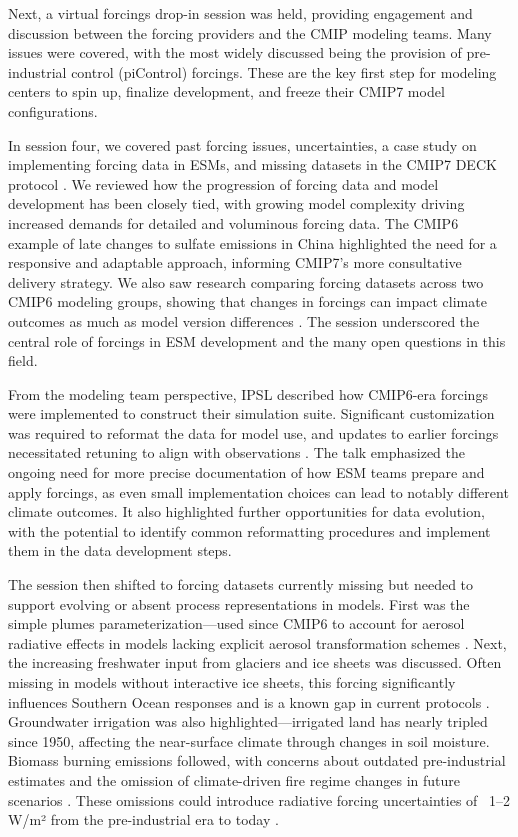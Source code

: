 \documentclass{ametsocV6.1}
\begin{document}
Next, a virtual forcings drop-in session was held, providing engagement and discussion between the forcing providers and the CMIP modeling teams. Many issues were covered, with the most widely discussed being the provision of pre-industrial control (piControl) forcings. These are the key first step for modeling centers to spin up, finalize development, and freeze their CMIP7 model configurations.

In session four, we covered past forcing issues, uncertainties, a case study on implementing forcing data in ESMs, and missing datasets in the CMIP7 DECK protocol \citep{dunne_evolving_2024}. We reviewed how the progression of forcing data and model development has been closely tied, with growing model complexity driving increased demands for detailed and voluminous forcing data. The CMIP6 example of late changes to sulfate emissions in China highlighted the need for a responsive and adaptable approach, informing CMIP7’s more consultative delivery strategy. We also saw research comparing forcing datasets across two CMIP6 modeling groups, showing that changes in forcings can impact climate outcomes as much as model version differences \citep{fyfe_significant_2021,holland_new_2024}. The session underscored the central role of forcings in ESM development and the many open questions in this field.

From the modeling team perspective, IPSL described how CMIP6-era forcings were implemented to construct their simulation suite. Significant customization was required to reformat the data for model use, and updates to earlier forcings necessitated retuning to align with observations \citep{lurton_implementation_2020}. The talk emphasized the ongoing need for more precise documentation of how ESM teams prepare and apply forcings, as even small implementation choices can lead to notably different climate outcomes. It also highlighted further opportunities for data evolution, with the potential to identify common reformatting procedures and implement them in the data development steps. 

The session then shifted to forcing datasets currently missing but needed to support evolving or absent process representations in models. First was the simple plumes parameterization—used since CMIP6 to account for aerosol radiative effects in models lacking explicit aerosol transformation schemes \citep[e.g.,][]{stevens_macv2-sp_2017,fiedler_anthropogenic_2019}. Next, the increasing freshwater input from glaciers and ice sheets was discussed. Often missing in models without interactive ice sheets, this forcing significantly influences Southern Ocean responses and is a known gap in current protocols \citep[e.g.,][]{roach_winds_2023,schmidt_anomalous_2023}. Groundwater irrigation was also highlighted—irrigated land has nearly tripled since 1950, affecting the near-surface climate through changes in soil moisture. Biomass burning emissions followed, with concerns about outdated pre-industrial estimates and the omission of climate-driven fire regime changes in future scenarios \citep[e.g.,][]{chen_multi-decadal_2023,hamilton_global_2024}. These omissions could introduce radiative forcing uncertainties of ~1–2 W/m² from the pre-industrial era to today \citep{hamilton_reassessment_2018,wan_importance_2021}.
\end{document}
